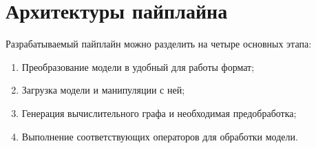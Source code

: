 \documentclass[a4paper,14pt]{extreport}
\begin{document}
        
    \chapter{Архитектуры пайплайна}
        Разрабатываемый пайплайн можно разделить на четыре основных этапа:
        \begin{enumerate}
            \item Преобразование модели в удобный для работы формат;
            \item Загрузка модели и манипуляции с ней;
            \item Генерация вычислительного графа и необходимая предобработка;
            \item Выполнение соответствующих операторов для обработки модели.
        \end{enumerate}
        
\end{document}
